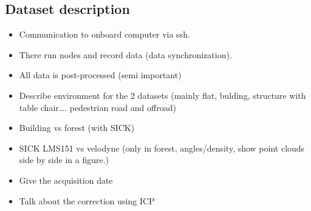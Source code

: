 \subsection{Dataset description}
\label{ssec:chap_slam_platform}

\begin{itemize}
    \item Communication to onboard computer via ssh.
    \item There run nodes and record data (data synchronization).
    \item All data is post-processed (semi important)
    \item Describe environment for the 2 datasets (mainly flat, bulding, structure with table chair\dots. pedestrian road and offroad)
    \item Building vs forest (with SICK)
    \item SICK LMS151 vs velodyne (only in forest, angles/density, show point clouds side by side in a figure.)
    \item Give the acquisition date
    \item Talk about the correction using ICP
\end{itemize}

